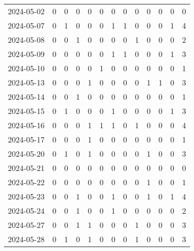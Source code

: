 \documentclass[dvipdfmx,oneside]{article}
\begin{document}
\begin{longtable}{lcccccccccccc}
        2024-05-02 &     0 &     0 &     0 &     0 &     0 &     0 &     0 &     0 &     0 &     0 &     0 &      0 \\
        2024-05-07 &     0 &     1 &     0 &     0 &     0 &     1 &     1 &     0 &     0 &     0 &     1 &      4 \\
        2024-05-08 &     0 &     0 &     1 &     0 &     0 &     0 &     0 &     1 &     0 &     0 &     0 &      2 \\
        2024-05-09 &     0 &     0 &     0 &     0 &     0 &     1 &     1 &     0 &     0 &     0 &     1 &      3 \\
        2024-05-10 &     0 &     0 &     0 &     0 &     1 &     0 &     0 &     0 &     0 &     0 &     0 &      1 \\
        2024-05-13 &     0 &     0 &     0 &     1 &     0 &     0 &     0 &     0 &     1 &     1 &     0 &      3 \\
        2024-05-14 &     0 &     0 &     1 &     0 &     0 &     0 &     0 &     0 &     0 &     0 &     0 &      1 \\
        2024-05-15 &     0 &     1 &     0 &     0 &     0 &     1 &     0 &     0 &     0 &     0 &     1 &      3 \\
        2024-05-16 &     0 &     0 &     0 &     1 &     1 &     1 &     0 &     1 &     0 &     0 &     0 &      4 \\
        2024-05-17 &     0 &     0 &     0 &     1 &     0 &     0 &     0 &     0 &     0 &     0 &     0 &      1 \\
        2024-05-20 &     0 &     1 &     0 &     1 &     0 &     0 &     0 &     0 &     1 &     0 &     0 &      3 \\
        2024-05-21 &     0 &     0 &     0 &     0 &     0 &     0 &     0 &     0 &     0 &     0 &     0 &      0 \\
        2024-05-22 &     0 &     0 &     0 &     0 &     0 &     0 &     0 &     0 &     1 &     0 &     0 &      1 \\
        2024-05-23 &     0 &     0 &     1 &     0 &     0 &     1 &     0 &     0 &     1 &     0 &     1 &      4 \\
        2024-05-24 &     0 &     0 &     1 &     0 &     0 &     1 &     0 &     0 &     0 &     0 &     0 &      2 \\
        2024-05-27 &     0 &     0 &     1 &     1 &     0 &     0 &     0 &     1 &     0 &     0 &     0 &      3 \\
        2024-05-28 &     0 &     1 &     0 &     1 &     0 &     0 &     0 &     1 &     0 &     0 &     0 &      3 \\

\end{longtable}
\end{document}

